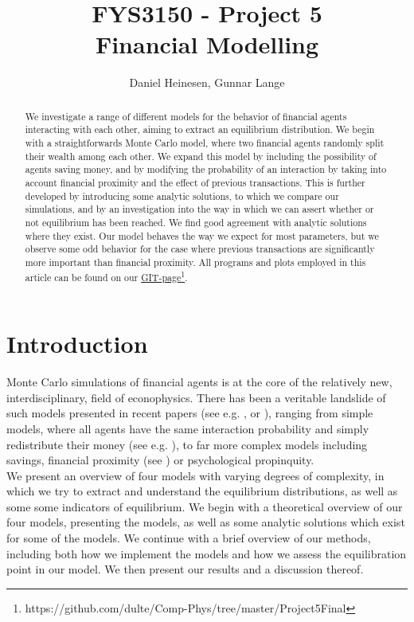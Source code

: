 \documentclass[a4paper, 10pt]{article}
\title{FYS3150 - Project 5\\
Financial Modelling}
\author{Daniel Heinesen, Gunnar Lange}
\begin{document}
\maketitle
\begin{abstract}
We investigate a range of different models for the behavior of financial agents interacting with each other, aiming to extract an equilibrium distribution. We begin with a straightforwards Monte Carlo model, where two financial agents randomly split their wealth among each other. We expand this model by including the possibility of agents saving money, and by modifying the probability of an interaction by taking into account financial proximity and the effect of previous transactions. This is further developed by introducing some analytic solutions, to which we compare our simulations, and by an investigation into the way in which we can assert whether or not equilibrium has been reached. We find good agreement with analytic solutions where they exist. Our model behaves the way we expect for most parameters, but we observe some odd behavior for the case where previous transactions are significantly more important than financial proximity. All programs and plots employed in this article can be found on our \href{https://github.com/dulte/Comp-Phys/tree/master/Project5Final}{GIT-page}\footnote{https://github.com/dulte/Comp-Phys/tree/master/Project5Final}.
\end{abstract}
\tableofcontents
\section{Introduction}
Monte Carlo simulations of financial agents is at the core of the relatively new, interdisciplinary, field of econophysics. There has been a veritable landslide of such models presented in recent papers (see e.g. \cite{Self-adjusted}, \cite{Finite-size} or \cite{AgentBased}), ranging from simple models, where all agents have the same interaction probability and simply redistribute their money (see e.g. \cite{Gibbs}), to far more complex models including savings, financial proximity (see \cite{AgentBased}) or psychological propinquity.\\
\linebreak
We present an overview of four models with varying degrees of complexity, in which we try to extract and understand the equilibrium distributions, as well as some some indicators of equilibrium. We begin with a theoretical overview of our four models, presenting the models, as well as some analytic solutions which exist for some of the models. We continue with a brief overview of our methods, including both how we implement the models and how we assess the equilibration point in our model. We then present our results and a discussion thereof.
\end{document}
